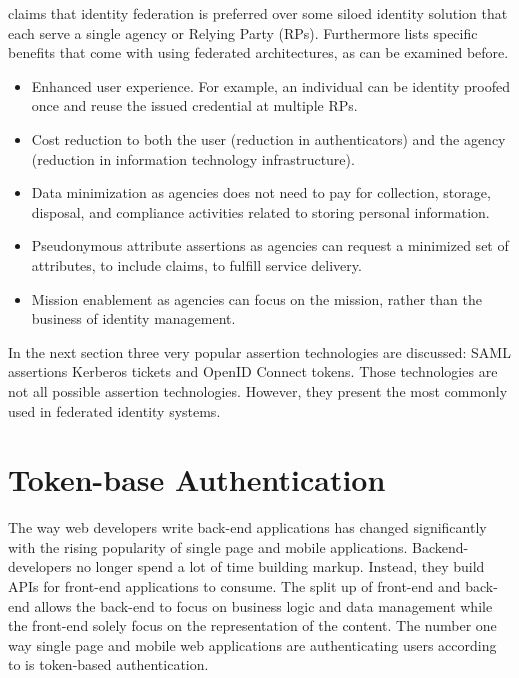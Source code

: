 {	
	\cite{NIST:2017:DIG} claims that identity federation is preferred over some siloed identity solution that each serve a single agency or Relying Party (RPs). Furthermore \cite{NIST:2017:DIG} lists specific benefits that come with using federated architectures, as can be examined before. 
	
	\begin{itemize}
		\item Enhanced user experience. For example, an individual can be identity proofed once and reuse the issued credential at multiple RPs. 
		\item Cost reduction to both the user (reduction in authenticators) and the agency (reduction in information technology infrastructure). 
		\item Data minimization as agencies does not need to pay for collection, storage, disposal, and compliance activities related to storing personal information. 
		\item Pseudonymous attribute assertions as agencies can request a minimized set of attributes, to include claims, to fulfill service delivery. 
		\item Mission enablement as agencies can focus on the mission, rather than the business of identity management.
	\end{itemize}
	
	In the next section three very popular assertion technologies are discussed: SAML assertions Kerberos tickets and OpenID Connect tokens. Those technologies are not all possible assertion technologies. However, they present the most commonly used in federated identity systems. 


 


\section{Token-base Authentication}


The way web developers write back-end applications has changed significantly with the rising popularity of single page and mobile applications. Backend-developers no longer spend a lot of time building markup. Instead, they build APIs for front-end applications to consume. The split up of front-end and back-end allows the back-end to focus on business logic and data management while the front-end solely focus on the representation of the content. The number one way single page and mobile web applications are authenticating users according to \cite{Tkalec:2015} is token-based authentication.

}
